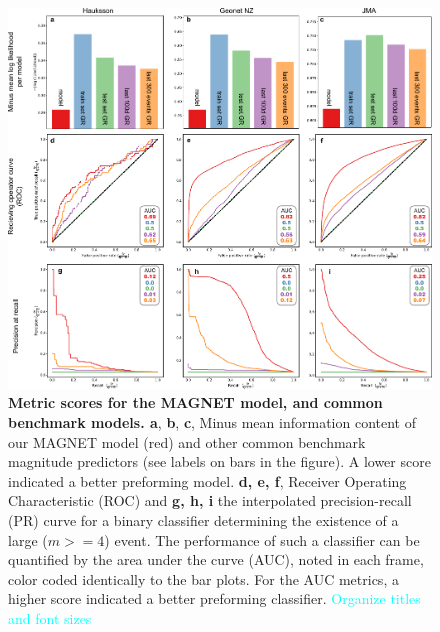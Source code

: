\documentclass[pdflatex]{sn-jnl}
\newcommand{\neri}[1]{{\textcolor{cyan}{#1}}}
\begin{document}
\begin{figure}[h!]
    \centering
    \includegraphics[width=1\textwidth]{figures/combined_batplots.pdf}
    \caption{
        \textbf{Metric scores for the MAGNET model, and common benchmark models. a}, \textbf{b}, \textbf{c}, Minus mean information content of our MAGNET model (red) and other common benchmark magnitude predictors (see labels on bars in the figure). A lower score indicated a better preforming model. \textbf{d, e, f}, Receiver Operating Characteristic (ROC) and \textbf{g, h, i} the interpolated precision-recall (PR) curve for a binary classifier determining the existence of a large ($m>=4$) event. The performance of such a classifier can be quantified by the area under the curve (AUC), noted in each frame, color coded identically to the bar plots. For the AUC metrics, a higher score indicated a better preforming classifier.
        \neri{Organize titles and font sizes}
        }
        \label{fig:metrics}
\end{figure}
\end{document}
